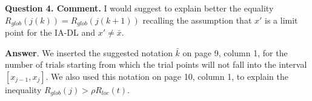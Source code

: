 \documentclass[12pt]{article}%
\begin{document}
\phantom{f}

\textbf{Question 4. Comment.} I would suggest to explain better the equality $R_{glob}(j(k)) = R_{glob}(j(k+1))$
recalling the assumption that $x'	$ is a limit point for the IA-DL and $x' \neq \bar x$.

\textbf{Answer}. We inserted the suggested notation $\bar k$ on page 9, column 1, for the number of trials starting from which the trial points will not fall into the interval $[x_{j-1}, x_j]$. We also used this notation on page 10, column 1, to explain the inequality $R_{glob}(j) > \rho R_{loc}(t)$.

%
%
%
%
\end{document}
